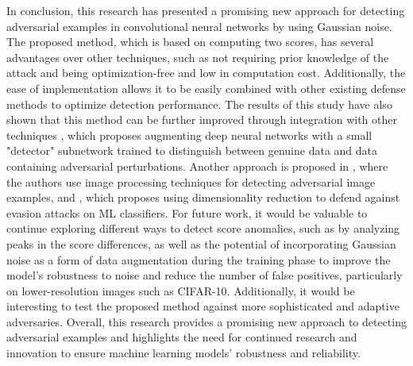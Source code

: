 \begin{summary}
	\overridetextsize
	\label{conclusion}

	In conclusion, this research has presented a promising new approach for
	detecting adversarial examples in convolutional neural networks by using
	Gaussian noise. The proposed method, which is based on computing two scores, has
	several advantages over other techniques, such as not requiring prior knowledge
	of the attack and being optimization-free and low in computation cost.
	Additionally, the ease of implementation allows it to be easily combined with
	other existing defense methods to optimize detection performance. The results of
	this study have also shown that this method can be further improved through
	integration with other techniques \cite{metzen_detecting_2017}, which proposes
	augmenting deep neural networks with a small "detector" subnetwork trained to
	distinguish between genuine data and data containing adversarial perturbations.
	Another approach is proposed in \cite{liang_detecting_2021}, where the authors
	use image processing techniques for detecting adversarial image examples, and
	\cite{bhagoji_dimensionality_2017}, which proposes using dimensionality
	reduction to defend against evasion attacks on ML classifiers. For future work,
	it would be valuable to continue exploring different ways to detect score
	anomalies, such as by analyzing peaks in the score differences, as well as the
	potential of incorporating Gaussian noise as a form of data augmentation during
	the training phase to improve the model's robustness to noise and reduce the
	number of false positives, particularly on lower-resolution images such as
	CIFAR-10. Additionally, it would be interesting to test the proposed method
	against more sophisticated and adaptive adversaries. Overall, this research
	provides a promising new approach to detecting adversarial examples and
	highlights the need for continued research and innovation to ensure machine
	learning models' robustness and reliability.
\end{summary}
